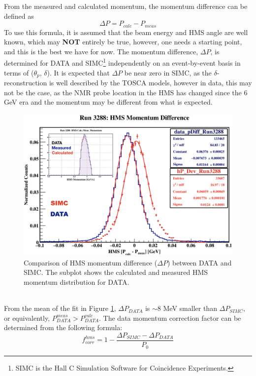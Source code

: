 \documentclass[11pt]{article}
\begin{document}
From the measured and calculated momentum,
the momentum difference can be defined as
\begin{equation}
  \Delta P = P_{calc}-P_{meas}
  \label{eq:3}
\end{equation}
To use this formula, it is assumed that the beam energy and HMS angle are well known, which may \textbf{NOT} entirely be true, however,
one needs a starting point, and this is the best we have for now. The momentum difference, $\Delta P$, is determined for DATA and
SIMC\footnote{SIMC is the Hall C Simulation Software for Coincidence Experiments.} independently on an event-by-event basis in terms of
($\theta_{p}$, $\delta$). It is expected that $\Delta P$ be near zero in SIMC, as the $\delta$-reconstruction is well described by the TOSCA models, however in
data, this may not be the case, as the NMR probe location in the HMS has changed since the 6 GeV era and the momentum may be different from what is expected. 
\begin{figure}[h!]
  \centering
  \includegraphics[scale=0.4]{plots/hms_Pdiff.png}
  \caption{Comparison of HMS momentum difference ($\Delta P$) between DATA and SIMC. The subplot shows the calculated and measured
  HMS momentum distribution for DATA.}
  \label{fig:hms_Pdiff}
\end{figure}\\
From the mean of the fit in Figure \ref{fig:hms_Pdiff}, $\Delta P_{DATA}$ is $\sim$8 MeV smaller than $\Delta P_{SIMC}$, or equivalently,
$P_{DATA}^{meas} > P_{DATA}^{calc}$. The data momentum correction factor can be determined from the following formula:
\begin{equation}
  f^{hms}_{corr} = 1 - \frac{\Delta P_{SIMC} - \Delta P_{DATA}}{P_{0}}
  \label{eq:4}
\end{equation}
\end{document}
